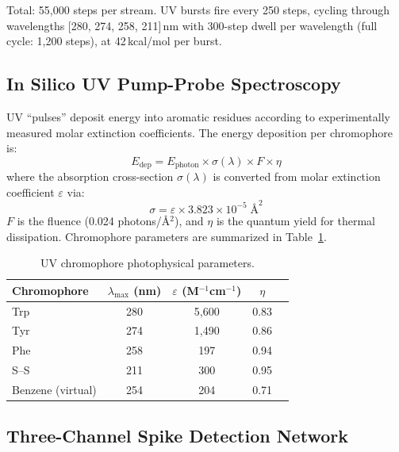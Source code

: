 \documentclass[11pt,twocolumn]{article}
\begin{document}
Total: 55{,}000 steps per stream. UV bursts fire every 250 steps, cycling through
wavelengths [280, 274, 258, 211]\,nm with 300-step dwell per wavelength (full cycle: 1{,}200
steps), at 42\,kcal/mol per burst.

\subsection{In Silico UV Pump-Probe Spectroscopy}

UV ``pulses'' deposit energy into aromatic residues according to experimentally measured
molar extinction coefficients. The energy deposition per chromophore is:
\begin{equation}
  E_{\text{dep}} = E_{\text{photon}} \times \sigma(\lambda) \times F \times \eta
  \label{eq:energy_dep}
\end{equation}
where the absorption cross-section $\sigma(\lambda)$ is converted from molar extinction
coefficient $\varepsilon$ via:
\begin{equation}
  \sigma = \varepsilon \times 3.823 \times 10^{-5} \; \text{\AA}^2
  \label{eq:sigma_conversion}
\end{equation}
$F$ is the fluence (0.024 photons/\AA$^2$), and $\eta$ is the quantum yield for thermal
dissipation. Chromophore parameters are summarized in Table~\ref{tab:chromophores}.

\begin{table}[h]
\centering
\caption{UV chromophore photophysical parameters.}
\label{tab:chromophores}
\begin{tabular}{lcccc}
\toprule
Chromophore & $\lambda_{\max}$ (nm) & $\varepsilon$ (M$^{-1}$cm$^{-1}$) & $\eta$ \\
\midrule
Trp & 280 & 5{,}600 & 0.83 \\
Tyr & 274 & 1{,}490 & 0.86 \\
Phe & 258 & 197 & 0.94 \\
S--S & 211 & 300 & 0.95 \\
Benzene (virtual) & 254 & 204 & 0.71 \\
\bottomrule
\end{tabular}
\end{table}

\subsection{Three-Channel Spike Detection Network}
\end{document}
